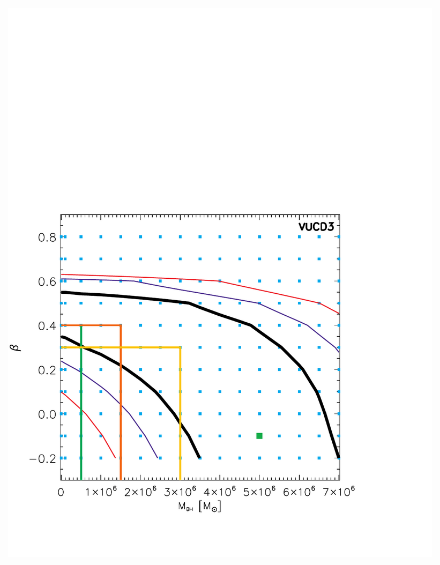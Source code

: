 \documentclass{aastex}
\begin{document}
\begin{figure}[ht!]
  \centering
  \begin{minipage}{0.45\textwidth}
    \includegraphics[trim={0.1cm 0 0 10cm},clip,scale=0.45]{vucd3_betambh.pdf}%
  \end{minipage}
  \begin{minipage}{0.45\textwidth}

\end{minipage}
\end{figure}
\end{document}
